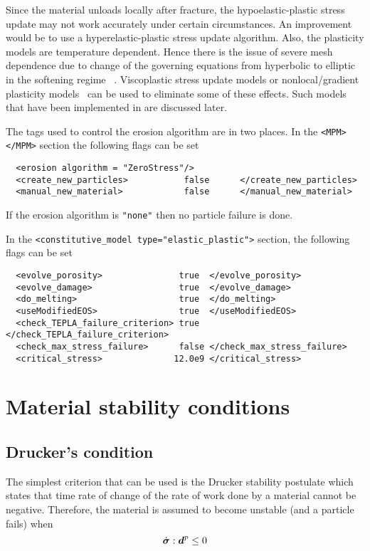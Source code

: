 Since the material unloads locally after fracture, the 
hypoelastic-plastic stress update may not work accurately under certain 
circumstances.  An improvement would be to use a hyperelastic-plastic stress 
update algorithm.  Also, the plasticity models are temperature dependent.
Hence there is the issue of severe mesh dependence due to change of the
governing equations from hyperbolic to elliptic in the softening regime
~\cite{Hill1975,Bazant1985,Tver1990}.  Viscoplastic stress update models or 
nonlocal/gradient plasticity models~\cite{Ramaswamy1998,Hao2000} can be used 
to eliminate some of these effects.  Such models that have been
implemented in \Vaango are discussed later.

The tags used to control the erosion algorithm are in two places.  
In the \verb|<MPM> </MPM>| section the following flags can be set
\lstset{language=XML}
\begin{lstlisting}
  <erosion algorithm = "ZeroStress"/>
  <create_new_particles>           false      </create_new_particles>
  <manual_new_material>            false      </manual_new_material>
\end{lstlisting}
If the erosion algorithm is \verb|"none"| then no particle failure is done.

In the \verb|<constitutive_model type="elastic_plastic">| section, the 
following flags can be set
\lstset{language=XML}
\begin{lstlisting}
  <evolve_porosity>               true  </evolve_porosity>
  <evolve_damage>                 true  </evolve_damage>
  <do_melting>                    true  </do_melting>
  <useModifiedEOS>                true  </useModifiedEOS>
  <check_TEPLA_failure_criterion> true  </check_TEPLA_failure_criterion>
  <check_max_stress_failure>      false </check_max_stress_failure>
  <critical_stress>              12.0e9 </critical_stress>
\end{lstlisting}

\section{Material stability conditions}
\subsection{Drucker's condition}
The simplest criterion that can be used is the Drucker stability postulate 
\cite{Drucker1959} which states that time rate of change of the rate of 
work done by a material cannot be negative.  Therefore, the material is 
assumed to become unstable (and a particle fails) when
\begin{equation}
  \dot{\boldsymbol{\sigma}}:\boldsymbol{d}^p \le 0
\end{equation}

